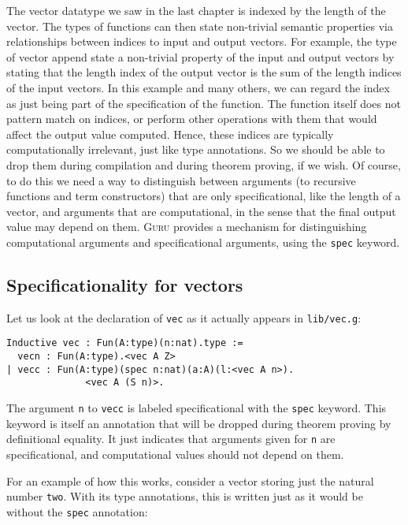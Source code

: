 \documentclass{book}[12pt]
\newcommand{\guru}[0]{\textsc{Guru}\xspace}
\begin{document}
The vector datatype we saw in the last chapter is indexed by the
length of the vector.  The types of functions can then state
non-trivial semantic properties via relationships between indices to
input and output vectors.  For example, the type of vector append
state a non-trivial property of the input and output vectors by
stating that the length index of the output vector is the sum of the
length indices of the input vectors.  In this example and many others,
we can regard the index as just being part of the specification of the
function.  The function itself does not pattern match on indices, or
perform other operations with them that would affect the output value
computed.  Hence, these indices are typically computationally
irrelevant, just like type annotations.  So we should be able to drop
them during compilation and during theorem proving, if we wish.  Of
course, to do this we need a way to distinguish between arguments (to
recursive functions and term constructors) that are only
specificational, like the length of a vector, and arguments that are
computational, in the sense that the final output value may depend on
them.  \guru provides a mechanism for distinguishing computational
arguments and specificational arguments, using the \texttt{spec}
keyword.  

\subsection{Specificationality for vectors}

Let us look at the declaration of \texttt{vec} as it actually appears
in \texttt{lib/vec.g}:

\begin{verbatim}
Inductive vec : Fun(A:type)(n:nat).type :=
  vecn : Fun(A:type).<vec A Z>
| vecc : Fun(A:type)(spec n:nat)(a:A)(l:<vec A n>).
              <vec A (S n)>.
\end{verbatim}

\noindent The argument \texttt{n} to \texttt{vecc} is labeled
specificational with the \texttt{spec} keyword.  This keyword is
itself an annotation that will be dropped during theorem proving by
definitional equality.  It just indicates that arguments given for
\texttt{n} are specificational, and computational values should not
depend on them.  

For an example of how this works, consider a vector storing just the
natural number \texttt{two}.  With its type annotations, this is
written just as it would be without the \texttt{spec} annotation:
\end{document}
